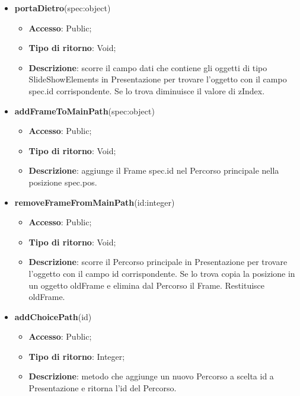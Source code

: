 {\begin{itemize}
\begin{itemize}
				\item \textbf{Descrizione}: scorre il campo dati che contiene gli oggetti di tipo SlideShowElements in Presentazione per trovare l’oggetto con il campo spec.id corrispondente. Se lo trova aumenta il valore di zIndex.
			\end{itemize}
			\item \textbf{portaDietro}(spec:object)
			\begin{itemize}
				\item \textbf{Accesso}: Public;
				\item \textbf{Tipo di ritorno}: Void;
				\item \textbf{Descrizione}: scorre il campo dati che contiene gli oggetti di tipo SlideShowElements in Presentazione per trovare l’oggetto con il campo spec.id corrispondente. Se lo trova diminuisce il valore di zIndex.
			\end{itemize}
			\item \textbf{addFrameToMainPath}(spec:object)
			\begin{itemize}
				\item \textbf{Accesso}: Public;
				\item \textbf{Tipo di ritorno}: Void;
				\item \textbf{Descrizione}: aggiunge il Frame spec.id nel Percorso principale nella posizione spec.pos.
			\end{itemize}
			\item \textbf{removeFrameFromMainPath}(id:integer)
			\begin{itemize}
				\item \textbf{Accesso}: Public;
				\item \textbf{Tipo di ritorno}: Void;
				\item \textbf{Descrizione}: scorre il Percorso principale in Presentazione per trovare l’oggetto con il campo id corrispondente. Se lo trova copia la posizione in un oggetto oldFrame e elimina dal Percorso\ped{g} il Frame. Restituisce oldFrame.
			\end{itemize}
			\item \textbf{addChoicePath}(id)
			\begin{itemize}
				\item \textbf{Accesso}: Public;
				\item \textbf{Tipo di ritorno}: Integer;
				\item \textbf{Descrizione}: metodo che aggiunge un nuovo Percorso a scelta id a Presentazione e ritorna l'id del Percorso.

\end{itemize}
\end{itemize}}
